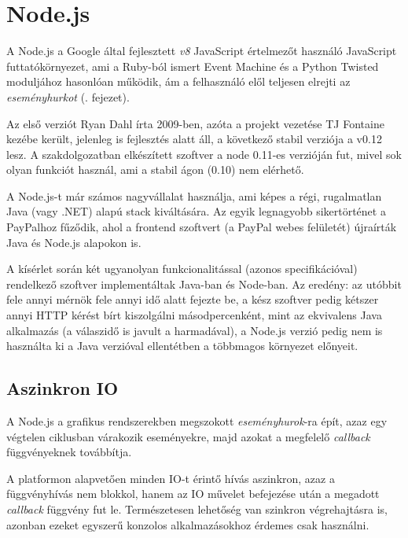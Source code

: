 \section{Node.js}

A Node.js a Google által fejlesztett \emph{v8} JavaScript értelmezőt használó
JavaScript futtatókörnyezet\cite{Node}, ami a Ruby-ból ismert Event Machine
\cite{EventMachine} és a Python Twisted\cite{Twisted} moduljához hasonlóan
működik, ám a felhasználó elől teljesen elrejti az \emph{eseményhurkot}
(. fejezet).

Az első verziót Ryan Dahl írta 2009-ben, azóta a projekt vezetése TJ Fontaine
kezébe került\cite{Node-TJ}, jelenleg is fejlesztés alatt áll, a következő stabil verziója
a v0.12 lesz. A szakdolgozatban elkészített szoftver a node 0.11-es verzióján
fut, mivel sok olyan funkciót használ, ami a stabil ágon (0.10) nem elérhető.

A Node.js-t már számos nagyvállalat használja, ami képes a régi,
rugalmatlan Java (vagy .NET) alapú stack kiváltására.
Az egyik legnagyobb sikertörténet a PayPalhoz fűződik, ahol a frontend
szoftvert (a PayPal webes felületét) újraírták Java és Node.js alapokon is.
\cite{PayPal-Case}

A kísérlet során két ugyanolyan funkcionalitással (azonos specifikációval)
rendelkező szoftver implementáltak Java-ban és Node-ban. Az eredény:
az utóbbit fele annyi mérnök fele annyi idő alatt fejezte be,
a kész szoftver pedig kétszer annyi HTTP kérést bírt kiszolgálni
másodpercenként, mint az ekvivalens Java alkalmazás
(a válaszidő is javult a harmadával), a Node.js verzió pedig nem is
használta ki a Java verzióval ellentétben a többmagos környezet előnyeit.

\subsection{Aszinkron IO}\label{sec:async-io}

A Node.js a grafikus rendszerekben megszokott \emph{eseményhurok}-ra épít,
azaz egy végtelen ciklusban várakozik eseményekre, majd azokat a megfelelő
\emph{callback} függvényeknek továbbítja.

A platformon alapvetően minden IO-t érintő hívás aszinkron,
azaz a függvényhívás nem blokkol, hanem az IO művelet befejezése után
a megadott \emph{callback} függvény fut le. Természetesen lehetőség van
szinkron végrehajtásra is, azonban ezeket egyszerű konzolos
alkalmazásokhoz érdemes csak használni.

